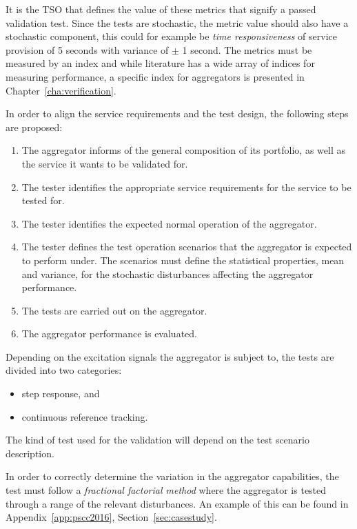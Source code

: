 It is the TSO that defines the value of these metrics that signify a passed validation test. Since the tests are stochastic, the metric value should also have a stochastic component, this could for example be \emph{time responsiveness} of service provision of 5 seconds with variance of $\pm$ 1 second. The metrics must be measured by an index and while literature has a wide array of indices for measuring performance, a specific index for aggregators is presented in Chapter~\ref{cha:verification}.

In order to align the service requirements and the test design, the following steps are proposed:
\begin{enumerate}
	\item The aggregator informs of the general composition of its portfolio, as well as the service it wants to be validated for.
	\item The tester identifies the appropriate service requirements for the service to be tested for.
	\item The tester identifies the expected normal operation of the aggregator.
	\item The tester defines the test operation scenarios that the aggregator is expected to perform under. The scenarios must define the statistical properties, \eg mean and variance, for the stochastic disturbances affecting the aggregator performance.
	\item The tests are carried out on the aggregator.
	\item The aggregator performance is evaluated.	
\end{enumerate}

Depending on the excitation signals the aggregator is subject to, the tests are divided into two categories:
\begin{itemize}
	\item step response, and
	\item continuous reference tracking.
\end{itemize}
The kind of test used for the validation will depend on the test scenario description.

In order to correctly determine the variation in the aggregator capabilities, the test must follow a \emph{fractional factorial method} where the aggregator is tested through a range of the relevant disturbances. An example of this can be found in Appendix~\ref{app:pscc2016}, Section~\ref{sec:casestudy}.

